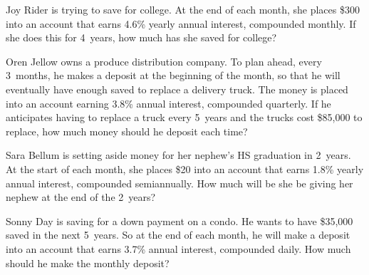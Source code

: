 \documentclass[11pt,letterpaper]{article}
\begin{document}

 Joy Rider is trying to save for college. At the end of each month, she places \$300 into an account that earns 4.6\% yearly annual interest, compounded monthly. If she does this for 4~years, how much has she saved for college?



\newpage



 Oren Jellow owns a produce distribution company. To plan ahead, every 3~months, he makes a deposit at the beginning of the month, so that he will eventually have enough saved to replace a delivery truck. The money is placed into an account earning 3.8\% annual interest, compounded quarterly. If he anticipates having to replace a truck every 5~years and the trucks cost \$85,000 to replace, how much money should he deposit each time?



\newpage



 Sara Bellum is setting aside money for her nephew's HS graduation in 2~years. At the start of each month, she places \$20 into an account that earns 1.8\% yearly annual interest, compounded semiannually. How much will be she be giving her nephew at the end of the 2~years?



\newpage



 Sonny Day is saving for a down payment on a condo. He wants to have \$35,000 saved in the next 5~years. So at the end of each month, he will make a deposit into an account that earns 3.7\% annual interest, compounded daily. How much should he make the monthly deposit?
\end{document}
